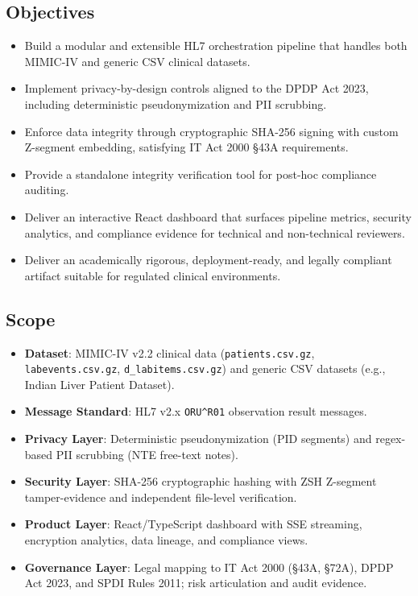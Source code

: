 \documentclass[12pt,a4paper]{report}
\begin{document}
\subsection*{Objectives}

\begin{itemize}
    \item Build a modular and extensible HL7 orchestration pipeline that handles both
    MIMIC-IV and generic CSV clinical datasets.
    \item Implement privacy-by-design controls aligned to the DPDP Act 2023, including
    deterministic pseudonymization and PII scrubbing.
    \item Enforce data integrity through cryptographic SHA-256 signing with custom
    Z-segment embedding, satisfying IT Act 2000 §43A requirements.
    \item Provide a standalone integrity verification tool for post-hoc compliance
    auditing.
    \item Deliver an interactive React dashboard that surfaces pipeline metrics,
    security analytics, and compliance evidence for technical and non-technical
    reviewers.
    \item Deliver an academically rigorous, deployment-ready, and legally compliant
    artifact suitable for regulated clinical environments.
\end{itemize}

\subsection*{Scope}

\begin{itemize}
    \item \textbf{Dataset}: MIMIC-IV v2.2 clinical data (\texttt{patients.csv.gz},
    \texttt{labevents.csv.gz}, \texttt{d\_labitems.csv.gz}) and generic CSV datasets
    (e.g., Indian Liver Patient Dataset).
    \item \textbf{Message Standard}: HL7 v2.x \texttt{ORU\string^R01} observation
    result messages.
    \item \textbf{Privacy Layer}: Deterministic pseudonymization (PID segments) and
    regex-based PII scrubbing (NTE free-text notes).
    \item \textbf{Security Layer}: SHA-256 cryptographic hashing with ZSH Z-segment
    tamper-evidence and independent file-level verification.
    \item \textbf{Product Layer}: React/TypeScript dashboard with SSE streaming,
    encryption analytics, data lineage, and compliance views.
    \item \textbf{Governance Layer}: Legal mapping to IT Act 2000 (§43A, §72A),
    DPDP Act 2023, and SPDI Rules 2011; risk articulation and audit evidence.
\end{itemize}
\end{document}

